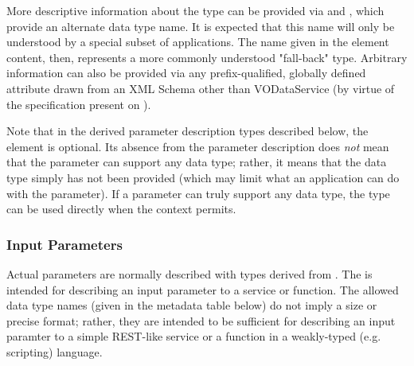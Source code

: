 \documentclass[11pt,a4paper]{ivoa}
\begin{document}
More descriptive information about the type can be provided via
 and , which
provide an alternate data type name.  It is expected that this name
will only be understood by a special subset of applications.  The name
given in the element content, then, represents a more commonly
understood "fall-back" type.   Arbitrary information can also be
provided via any prefix-qualified, globally defined attribute drawn
from an XML Schema other than VODataService (by virtue of the
 specification present
on ).





Note that in the derived parameter description types described below,
the  element is optional.  Its absence
from the parameter description does \emph{not} mean that the
parameter can support any data type; rather, it means that the data
type simply has not been provided (which may limit what an application
can do with the parameter).  If a parameter can truly support any data
type, the  type can be used directly when the
context permits.  


\subsubsection{Input Parameters}
\label{sect:inputparam}


Actual parameters are normally described with types derived from
.  The  is intended
for describing an input parameter to a service or function.  The
allowed data type names (given in the metadata table below) do not
imply a size or precise format; rather, they are intended to be
sufficient for describing an input paramter to a simple REST-like
service or a function in a weakly-typed (e.g. scripting) language.  
\end{document}

